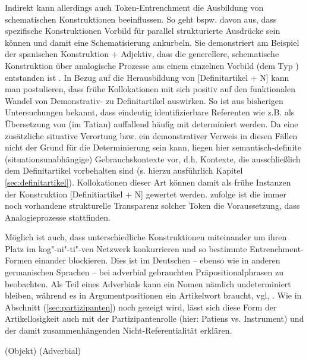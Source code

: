 Indirekt kann allerdings auch Token-Entrenchment die Ausbildung von schematischen Konstruktionen beeinflussen. So geht bspw. \textcite[96]{Bybee2010} davon aus, dass spezifische Konstruktionen Vorbild für parallel strukturierte Ausdrücke sein können und damit eine Schematisierung ankurbeln. Sie demonstriert am Beispiel der spanischen Konstruktion  + Adjektiv, dass die generellere, schematische  Konstruktion über analogische Prozesse aus einem einzelnen Vorbild (dem Typ ) entstanden ist \parencite[72]{Bybee2010}. In Bezug auf die Herausbildung von [Definitartikel + N] kann man postulieren, dass frühe Kollokationen mit  sich positiv auf den funktionalen Wandel von Demonstrativ- zu Definitartikel auswirken. So ist aus bisherigen Untersuchungen \parencite{Oubouzar1992} bekannt, dass eindeutig identifizierbare Referenten wie  z.B.  als Übersetzung von  (im Tatian) auffallend häufig mit  determiniert werden. Da eine zusätzliche situative Verortung bzw. ein demonstrativer Verweis in diesen Fällen nicht der Grund für die Determinierung sein kann, liegen hier semantisch-definite (situationsunabhängige) Gebrauchskontexte vor, d.h. Kontexte, die ausschließlich dem Definitartikel vorbehalten sind (s. hierzu ausführlich Kapitel \ref{sec:definitartikel}). Kollokationen dieser Art können damit als frühe Instanzen der Konstruktion [Definitiartikel + N] gewertet werden. \textcite[96]{Bybee2010} zufolge ist die immer noch vorhandene strukturelle Transparenz solcher Token die Voraussetzung, dass Analogieprozesse stattfinden.   

Möglich ist auch, dass unterschiedliche Konstruktionen miteinander um ihren Platz im kog"-ni"-ti"-ven Netzwerk konkurrieren und so bestimmte Entrenchment-Formen einander blockieren. Dies ist im Deutschen -- ebenso wie in anderen germanischen Sprachen \parencite[s.][]{Himmelmann1998} -- bei adverbial gebrauchten Präpositionalphrasen zu beobachten. Als Teil eines Adverbials kann ein Nomen nämlich undeterminiert bleiben, während es in Argumentpositionen ein Artikelwort braucht, vgl, . Wie in Abschnitt (\ref{sec:partizipanten}) noch gezeigt wird, lässt sich diese Form der Artikellosigkeit auch mit der Partizipantenrolle (hier: Patiens vs. Instrument) und der damit zusammenhängenden Nicht-Referentialität erklären.  

\begin{exe}
	\ex \label{ex:fuss}
	\begin{xlist}
		\ex \label{ex:denfuss}  (Objekt)
		\ex \label{ex:zufuss}  (Adverbial)
	\end{xlist}
\end{exe}

